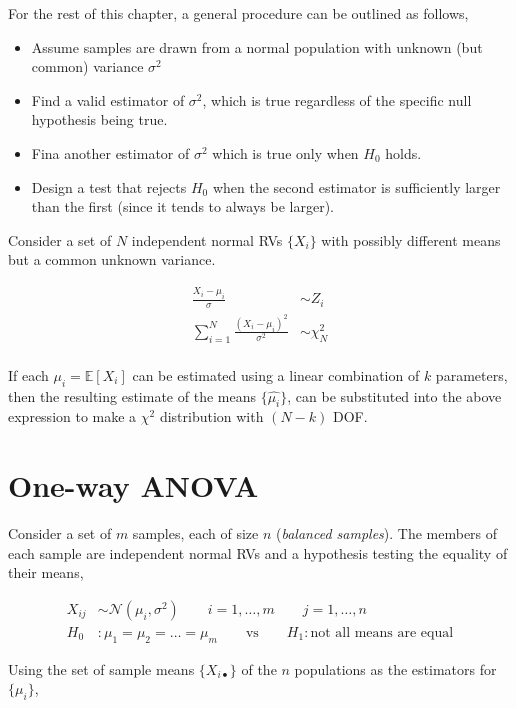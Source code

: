 For the rest of this chapter, a general procedure can be outlined as follows,

\begin{itemize}
	\item Assume samples are drawn from a normal population with unknown (but common) variance $ \sigma^2 $
	\item Find a valid estimator of $ \sigma^2 $, which is true regardless of the specific null hypothesis being true.
	\item Fina another estimator of $ \sigma^2 $ which is true only when $ H_0 $ holds.
	\item Design a test that rejects $ H_0 $ when the second estimator is sufficiently larger than the first (since it tends to always be larger). 
\end{itemize}


Consider a set of $ N $ independent normal RVs $ \{X_i\} $ with possibly different means but a common unknown variance. 

\begin{align}
	\frac{X_i - \mu_i}{\sigma} &\sim Z_i \nonumber \\
	\sum\limits_{i = 1}^{N} \frac{(X_i - \mu_i)^2}{\sigma^2} &\sim \chi^2_{N} \nonumber \\
\end{align}

If each $ \mu_i  = \mathbb{E}[X_i]$ can be estimated using a linear combination of $ k $ parameters, then the resulting estimate of the means $ \{\widehat{\mu_i}\} $, can be substituted into the above expression to make a $ \chi^2 $ distribution with $ (N-k) $ DOF.

\section{One-way ANOVA}

Consider a set of $ m $ samples, each of size $ n $ (\textit{balanced samples}). The members of each sample are independent normal RVs and a hypothesis testing the equality of their means,

\begin{align}
	X_{ij} &\sim \mathcal{N}(\mu_i, \sigma^2) \qquad i = 1,\dots,m \qquad j = 1,\dots,n \\
	H_0 &: \mu_1 = \mu_2 = \dots = \mu_m \qquad \text{vs} \qquad H_1 : \text{not all means are equal}
\end{align}

Using the set of sample means $ \{X_{i\bullet}\} $ of the $ n $ populations as the estimators for $ \{\mu_i\} $,

